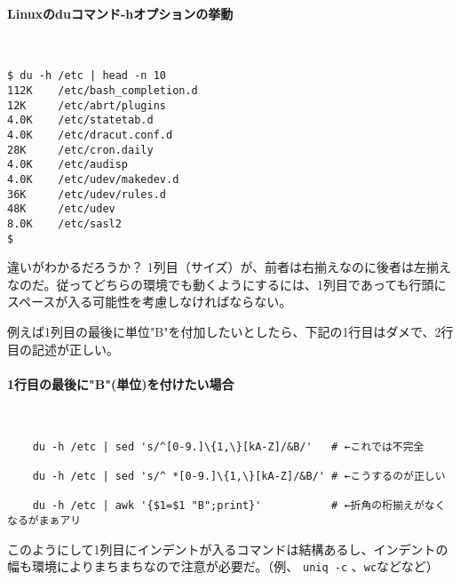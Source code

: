\paragraph{Linuxのduコマンド-hオプションの挙動} 　\\
\begin{screen}
	\verb!$ du -h /etc | head -n 10! \return \\
	\verb|112K    /etc/bash_completion.d| \\
	\verb|12K     /etc/abrt/plugins| \\
	\verb|4.0K    /etc/statetab.d| \\
	\verb|4.0K    /etc/dracut.conf.d| \\
	\verb|28K     /etc/cron.daily| \\
	\verb|4.0K    /etc/audisp| \\
	\verb|4.0K    /etc/udev/makedev.d| \\
	\verb|36K     /etc/udev/rules.d| \\
	\verb|48K     /etc/udev| \\
	\verb|8.0K    /etc/sasl2| \\
	\verb|$ |
\end{screen}

違いがわかるだろうか？ 1列目（サイズ）が、前者は右揃えなのに後者は左揃えなのだ。従ってどちらの環境でも動くようにするには、1列目であっても行頭にスペースが入る可能性を考慮しなければならない。

例えば1列目の最後に単位"B"を付加したいとしたら、下記の1行目はダメで、2行目の記述が正しい。

\paragraph{1行目の最後に"B"(単位)を付けたい場合} 　\\
\begin{frameboxit}{160.0mm}
\begin{verbatim}
	du -h /etc | sed 's/^[0-9.]\{1,\}[kA-Z]/&B/'   # ←これでは不完全

	du -h /etc | sed 's/^ *[0-9.]\{1,\}[kA-Z]/&B/' # ←こうするのが正しい

	du -h /etc | awk '{$1=$1 "B";print}'           # ←折角の桁揃えがなくなるがまぁアリ
\end{verbatim}
\end{frameboxit}

このようにして1列目にインデントが入るコマンドは結構あるし、インデントの幅も環境によりまちまちなので注意が必要だ。（例、 \verb|uniq -c| 、\verb|wc|などなど）

